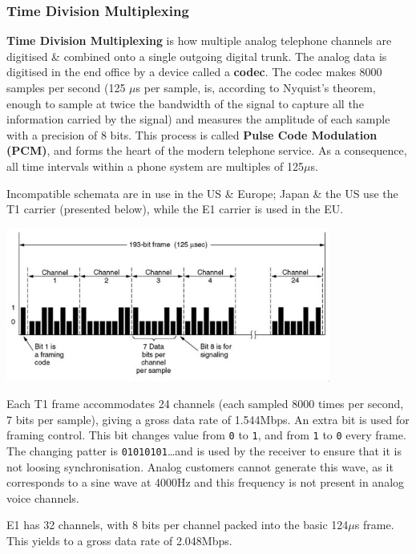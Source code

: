 \documentclass[11pt]{article}
\begin{document}
\subsubsection{Time Division Multiplexing} 
\textbf{Time Division Multiplexing} is how multiple analog telephone channels are digitised \& combined onto a single 
outgoing digital trunk. 
The analog data is digitised in the end office by a device called a \textbf{codec}. 
The codec makes 8000 samples per second (125 $\mu$s per sample, is, according to Nyquist's theorem, enough to sample at 
twice the bandwidth of the signal to capture all the information carried by the signal) and measures the amplitude of each 
sample with a precision of 8 bits. 
This process is called \textbf{Pulse Code Modulation (PCM)}, and forms the heart of the modern telephone service. 
As a consequence, all time intervals within a phone system are multiples of 125$\mu$s.

Incompatible schemata are in use in the US \& Europe; Japan \& the US use the T1 carrier (presented below), while the E1 
carrier is used in the EU. 

\begin{center}
    \includegraphics[width=0.8\textwidth]{tdm.png}
\end{center}

Each T1 frame accommodates 24 channels (each sampled 8000 times per second, 7 bits per sample), giving a gross data rate of 
1.544Mbps. 
An extra bit is used for framing control. 
This bit changes value from \verb|0| to \verb|1|, and from \verb|1| to \verb|0| every frame. 
The changing patter is \verb|01010101|\dots and is used by the receiver to ensure that it is not loosing synchronisation. 
Analog customers cannot generate this wave, as it corresponds to a sine wave at 4000Hz and this frequency is not present in 
analog voice channels.

E1 has 32 channels, with 8 bits per channel packed into the basic 124$\mu$s frame. 
This yields to a gross data rate of 2.048Mbps. 
\end{document}
